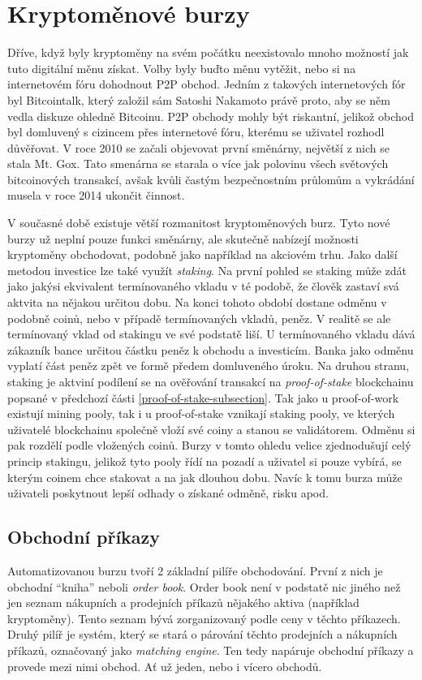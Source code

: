 \section{Kryptoměnové burzy}
\label{sec:Exchanges}
Dříve, když byly kryptoměny na svém počátku neexistovalo mnoho možností jak tuto digitální měnu získat. Volby byly buďto měnu vytěžit, nebo
si na internetovém fóru dohodnout P2P obchod. Jedním z takových internetových fór byl Bitcointalk, který založil sám Satoshi Nakamoto právě proto,
aby se něm vedla diskuze ohledně Bitcoinu. P2P obchody mohly být riskantní, jelikož obchod byl domluvený s cizincem přes internetové fóru, kterému
se uživatel rozhodl důvěřovat. V roce 2010 se začali objevovat první směnárny, největší z nich se stala Mt. Gox. Tato smenárna se starala o více jak polovinu
všech světových bitcoinových transakcí, avšak kvůli častým bezpečnostním průlomům a vykrádání musela v roce 2014 ukončit činnost.

V současné době existuje větší rozmanitost kryptoměnových burz. Tyto nové burzy už neplní pouze funkci směnárny, ale skutečně nabízejí možnosti
kryptoměny obchodovat, podobně jako například na akciovém trhu. Jako další metodou investice lze také využít \emph{staking}. Na první pohled se staking
může zdát jako jakýsi ekvivalent termínovaného vkladu v té podobě, že člověk zastaví svá aktvita na nějakou určitou dobu. Na konci tohoto období dostane
odměnu v podobně coinů, nebo v případě termínovaných vkladů, peněz. V realitě se ale termínovaný vklad od stakingu ve své podstatě liší. U termínovaného
vkladu dává zákazník bance určitou částku peněz k obchodu a investicím. Banka jako odměnu vyplatí část peněz zpět ve formě předem domluveného úroku.
Na druhou stranu, staking je aktviní podílení se na ověřování transakcí na \emph{proof-of-stake} blockchainu popsané v předchozí části
\ref{proof-of-stake-subsection}. Tak jako u proof-of-work existují mining pooly, tak i u proof-of-stake vznikají staking pooly, ve kterých uživatelé
blockchainu společně vloží své coiny a stanou se validátorem. Odměnu si pak rozdělí podle vložených coinů. Burzy v tomto ohledu velice zjednodušují
celý princip stakingu, jelikož tyto pooly řídí na pozadí a uživatel si pouze vybírá, se kterým coinem chce stakovat a na jak dlouhou dobu. Navíc k tomu
burza může uživateli poskytnout lepší odhady o získané odměně, risku apod.



\subsection{Obchodní příkazy}
Automatizovanou burzu tvoří 2 základní pilíře obchodování. První z nich je obchodní \enquote{kniha} neboli \emph{order book}. Order book není v podstatě nic
jiného než jen seznam nákupních a prodejních příkazů nějakého aktiva (například kryptoměny). Tento seznam bývá zorganizovaný podle ceny v těchto příkazech.
Druhý pilíř je systém, který se stará o párování těchto prodejních a nákupních příkazů, označovaný jako \emph{matching engine}. Ten tedy napáruje obchodní příkazy
a provede mezi nimi obchod. Ať už jeden, nebo i vícero obchodů.

